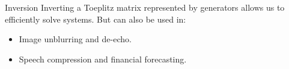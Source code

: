\begin{frame}{Inversion}
    Inverting a Toeplitz matrix represented by generators allows us to efficiently solve systems.
    But can also be used in:

    \begin{itemize}
        \item Image unblurring and de-echo.
        \item Speech compression and financial forecasting.
    \end{itemize}
\end{frame}